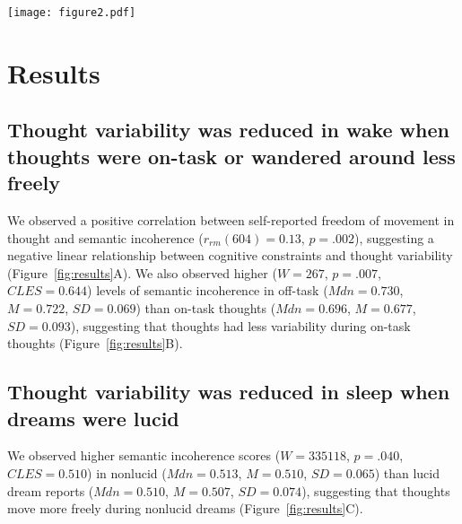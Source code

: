 \documentclass[10pt,a4paper,twocolumn]{article}
\begin{document}

\begin{figure*}[t]
    \centering
    \texttt{[image: figure2.pdf]}
    \caption{\textbf{Semantic incoherence was reduced under cognitive control in wake and sleep.} (A) Over multiple days of experience sampling during waking, increased thought variability was associated with decreased self-reported freedom of movement in thought. Each circle represents a unique experience sample. Each color/line represents a unique participant. (B) Over multiple days of experience sampling during waking, being focused on a task was associated with decreased thought variability. (C) In public dream journals representing thought during sleep, lucid dreams were associated with reduced thought variability compared to nonlucid dreams. *$\mathit{p}<.05$, **$\mathit{p}<.01$}
    \label{fig:results}
\end{figure*}

\section*{Results}

\subsection*{Thought variability was reduced in wake when thoughts were on-task or wandered around less freely}
We observed a positive correlation between self-reported freedom of movement in thought and semantic incoherence ($\mathit{r_{rm}}(604)=0.13$, $\mathit{p}=.002$), suggesting a negative linear relationship between cognitive constraints and thought variability (Figure~\ref{fig:results}A). We also observed higher ($\mathit{W}=267$, $\mathit{p}=.007$, $\mathit{CLES}=0.644$) levels of semantic incoherence in off-task ($\mathit{Mdn}=0.730$, $\mathit{M}=0.722$, $\mathit{SD}=0.069$) than on-task thoughts ($\mathit{Mdn}=0.696$, $\mathit{M}=0.677$, $\mathit{SD}=0.093$), suggesting that thoughts had less variability during on-task thoughts (Figure~\ref{fig:results}B).

\subsection*{Thought variability was reduced in sleep when dreams were lucid}
We observed higher semantic incoherence scores ($\mathit{W}=335118$, $\mathit{p}=.040$, $\mathit{CLES}=0.510$) in nonlucid ($\mathit{Mdn}=0.513$, $\mathit{M}=0.510$, $\mathit{SD}=0.065$) than lucid dream reports ($\mathit{Mdn}=0.510$, $\mathit{M}=0.507$, $\mathit{SD}=0.074$), suggesting that thoughts move more freely during nonlucid dreams (Figure~\ref{fig:results}C).
\end{document}
